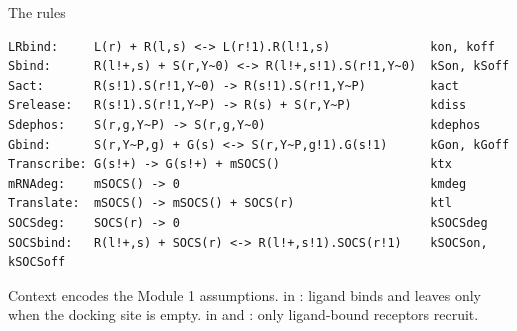 \documentclass[aspectratio=169,10pt,t]{beamer}
\begin{document}
\begin{frame}[fragile]{The rules}
\begin{lstlisting}[language=bngl,basicstyle=\ttfamily\footnotesize]
LRbind:     L(r) + R(l,s) <-> L(r!1).R(l!1,s)              kon, koff
Sbind:      R(l!+,s) + S(r,Y~0) <-> R(l!+,s!1).S(r!1,Y~0)  kSon, kSoff
Sact:       R(s!1).S(r!1,Y~0) -> R(s!1).S(r!1,Y~P)         kact
Srelease:   R(s!1).S(r!1,Y~P) -> R(s) + S(r,Y~P)           kdiss
Sdephos:    S(r,g,Y~P) -> S(r,g,Y~0)                       kdephos
Gbind:      S(r,Y~P,g) + G(s) <-> S(r,Y~P,g!1).G(s!1)      kGon, kGoff
Transcribe: G(s!+) -> G(s!+) + mSOCS()                     ktx
mRNAdeg:    mSOCS() -> 0                                   kmdeg
Translate:  mSOCS() -> mSOCS() + SOCS(r)                   ktl
SOCSdeg:    SOCS(r) -> 0                                   kSOCSdeg
SOCSbind:   R(l!+,s) + SOCS(r) <-> R(l!+,s!1).SOCS(r!1)    kSOCSon, kSOCSoff
\end{lstlisting}
  {\small Context encodes the Module 1 assumptions.  in : ligand
  binds and leaves only when the docking site is empty.  in 
  and : only ligand-bound receptors recruit.}
\end{frame}
\end{document}
